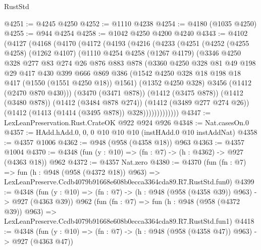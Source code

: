 \begin{lexlean}{RustStd}
\begin{coremodule}
@4251 := @4245 @4250
@4252 := @1110 @4238
@4254 := @4180 (@1035 @4250)
@4255 := @944 @4254
@4258 := @1042 @4250 @4200 @4240
@4343 := @4102
    (@4127
      (@4168
        (@4170
          (@4172
            (@4193
              (@4216
                (@4233
                  (@4251
                    (@4252
                      (@4255 @4258)
                      (@1262 @4107)
                      (@1110
                        @4254
                        @4258
                        (@1267 @4179)
                        (@3346
                          @4250
                          @328
                          @277
                          @83
                          @274
                          @26
                          @876
                          @883
                          @878
                          (@3360
                            @4250
                            @328
                            @81
                            @49
                            @198
                            @29
                            @417
                            @430
                            @399
                            @666
                            @869
                            @386
                            (@1542 @4250 @328 @18 @198 @18 @417 (@1550 (@1551 @4250 @18)) @1561)
                            (@1352 @4250 @328)
                            @3456
                            (@1412 (@2470 @870 @430)))
                          (@3470 (@3471 @878))
                          (@1412 (@3475 @878))
                          (@1412 (@3480 @878))
                          (@1412 (@3484 @878 @274))
                          (@1412 (@3489 @277 @274 @26))
                          (@1412 (@1413 (@1414 (@3495 @878)) @328)))))))))))))
@4347 := LexLeanPreservation.Rust.CrateOK @922 @924 @926
@4348 := Nat.casesOn.{0}
@4357 := HAdd.hAdd.{0, 0, 0} @10 @10 @10 (instHAdd.{0} @10 instAddNat)
@4358 := @4357 @1006
@4362 := @948 (@958 (@4358 @18)) @963
@4363 := @4357 @1004
@4370 := @4348 (fun (y : @10) => (fn : @7) -> (h : @4362) -> @927 (@4363 @18)) @962
@4372 := @4357 Nat.zero
@4380 := @4370
    (fun (fn : @7) =>
    fun (h : @948 (@958 (@4372 @18)) @963) =>
    LexLeanPreserve.Ccdb4079b91668e608b0ecca3364cda89.R7.RustStd.fun0)
@4399 := @4348
    (fun (y : @10) => (fn : @7) -> (h : @948 (@958 (@4358 @39)) @963) -> @927 (@4363 @39))
    @962
    (fun (fn : @7) =>
    fun (h : @948 (@958 (@4372 @39)) @963) =>
    LexLeanPreserve.Ccdb4079b91668e608b0ecca3364cda89.R7.RustStd.fun1)
@4418 := @4348
    (fun (y : @10) => (fn : @7) -> (h : @948 (@958 (@4358 @47)) @963) -> @927 (@4363 @47))

\end{coremodule}
\end{lexlean}
